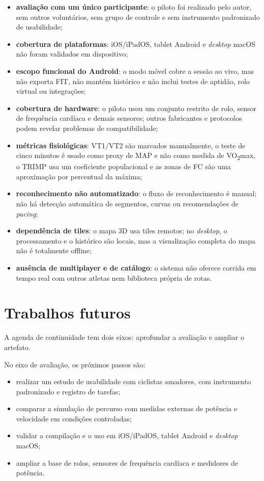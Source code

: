 \begin{itemize}
    \item \textbf{avaliação com um único participante}: o piloto foi realizado
        pelo autor, sem outros voluntários, sem grupo de controle e sem
        instrumento padronizado de usabilidade;
    \item \textbf{cobertura de plataformas}: iOS/iPadOS, tablet Android e
        \textit{desktop} macOS não foram validados em dispositivo;
    \item \textbf{escopo funcional do Android}: o modo móvel cobre a sessão ao
        vivo, mas não exporta FIT, não mantém histórico e não inclui testes de
        aptidão, rolo virtual ou integrações;
    \item \textbf{cobertura de hardware}: o piloto usou um conjunto restrito de
        rolo, sensor de frequência cardíaca e demais sensores; outros fabricantes
        e protocolos podem revelar problemas de compatibilidade;
    \item \textbf{métricas fisiológicas}: VT1/VT2 são marcados manualmente, o
        teste de cinco minutos é usado como proxy de MAP e não como medida de
        VO\textsubscript{2}max, o TRIMP usa um coeficiente populacional e as
        zonas de FC são uma aproximação por percentual da máxima;
    \item \textbf{reconhecimento não automatizado}: o fluxo de reconhecimento é
        manual; não há detecção automática de segmentos, curvas ou
        recomendações de \textit{pacing};
    \item \textbf{dependência de tiles}: o mapa 3D usa tiles remotos; no
        \textit{desktop}, o processamento e o histórico são locais, mas a
        visualização completa do mapa não é totalmente offline;
    \item \textbf{ausência de multiplayer e de catálogo}: o sistema não oferece
        corrida em tempo real com outros atletas nem biblioteca própria de
        rotas.
\end{itemize}

\section{Trabalhos futuros}
\label{sec:trabalhos-futuros}

A agenda de continuidade tem dois eixos: aprofundar a avaliação e ampliar o
artefato.

No eixo de avaliação, os próximos passos são:

\begin{itemize}
    \item realizar um estudo de usabilidade com ciclistas amadores, com
        instrumento padronizado e registro de tarefas;
    \item comparar a simulação de percurso com medidas externas de potência e
        velocidade em condições controladas;
    \item validar a compilação e o uso em iOS/iPadOS, tablet Android e
        \textit{desktop} macOS;
    \item ampliar a base de rolos, sensores de frequência cardíaca e medidores
        de potência.
\end{itemize}

